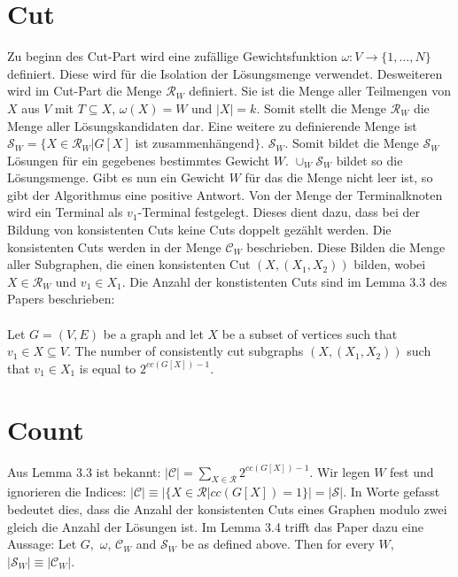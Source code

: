 \section{Cut}
\label{sec:st_cut}
Zu beginn des Cut-Part wird eine zufällige Gewichtsfunktion $\omega:V\rightarrow \{1,\dots,N\}$ definiert. Diese wird für die Isolation der Lösungsmenge verwendet.
Desweiteren wird im Cut-Part die Menge $\mathcal{R}_W$ definiert. Sie ist die Menge aller Teilmengen von $X$ aus $V$ mit $T \subseteq X$, $\omega(X)=W$ und $|X|=k$. Somit stellt die Menge $\mathcal{R}_W$ die Menge aller Lösungskandidaten dar.
Eine weitere zu definierende Menge ist $\mathcal{S}_W=\{X \in \mathcal{R}_W | G[X]$ ist zusammenhängend$\}$. $\mathcal{S}_W$. Somit bildet die Menge $\mathcal{S}_W$ Lösungen für ein gegebenes bestimmtes Gewicht $W$.
$\cup_W \mathcal{S}_W$ bildet so die Lösungsmenge. Gibt es nun ein Gewicht $W$ für das die Menge nicht leer ist, so gibt der Algorithmus eine positive Antwort.
Von der Menge der Terminalknoten wird ein Terminal als $v_1$-Terminal festgelegt. Dieses dient dazu, dass bei der Bildung von konsistenten Cuts keine Cuts doppelt gezählt werden.
Die konsistenten Cuts werden in der Menge  $\mathcal{C}_W$ beschrieben. Diese Bilden die Menge aller Subgraphen, die einen konsistenten Cut $(X,(X_1,X_2))$ bilden, wobei $X\in \mathcal{R}_W$ und $v_1 \in X_1$. Die Anzahl der konstistenten Cuts sind im Lemma 3.3 des Papers beschrieben:\\
\\
Let $G=(V,E)$ be a graph and let $X$ be a subset of vertices such that $v_1 \in X \subseteq V$. The number of
consistently cut subgraphs $(X,(X_1,X_2))$ such that $v_1 \in X_1$ is equal to $2^{cc(G[X])-1}$.

\section{Count}
\label{sec:st_count}
Aus Lemma 3.3 ist bekannt: $|\mathcal{C}|=\sum_{X \in \mathcal{R}} 2^{cc(G[X])-1}$. Wir legen $W$ fest und ignorieren die Indices: $|\mathcal{C}| \equiv |\{X \in \mathcal{R} |cc(G[X]) = 1\}| = |\mathcal{S}|$. In Worte gefasst bedeutet dies, dass die Anzahl der konsistenten Cuts eines Graphen modulo zwei gleich die Anzahl der Lösungen ist. Im Lemma 3.4 trifft das Paper dazu eine Aussage: Let $G,$ $\omega$, $\mathcal{C}_W$ and $\mathcal{S}_W$ be as defined above. Then for every $W$, $|\mathcal{S}_W| \equiv |\mathcal{C}_W|$.

